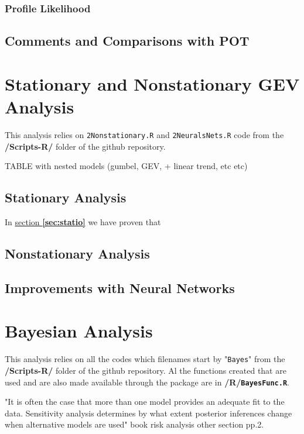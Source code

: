 \documentclass[11pt,a4paper,openany ]{book}
\begin{document}
\subsection{Profile Likelihood}



\section{Comments and Comparisons with POT}




\chapter{Stationary and Nonstationary GEV Analysis}\label{sec:ananonsta}
\minitoc \thispagestyle{empty}

This analysis relies on \texttt{2Nonstationary.R} and \texttt{2NeuralsNets.R} code from the \textbf{/Scripts-R/} folder of the github repository.

TABLE with nested models (gumbel, GEV, + linear trend, etc etc)


\section{Stationary Analysis}


In \hyperref[sec:statio]{section \textbf{\ref{sec:statio}}} we have proven that 

\section{Nonstationary Analysis}

\section{Improvements with Neural Networks}


\chapter{Bayesian Analysis}
\minitoc \thispagestyle{empty}

This analysis relies on all the codes which filenames start by "\texttt{Bayes}" from the \textbf{/Scripts-R/} folder of the github repository. Al the functions created that are used and are also made available through the package are in \textbf{/R/\texttt{BayesFunc.R}}.


"It is often the case that more than one model provides an adequate fit to the data. Sensitivity analysis determines by what extent posterior inferences change when alternative
models are used"   book risk analysis other section pp.2.
\end{document}
